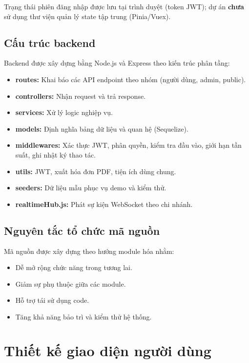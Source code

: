 \documentclass[../DoAn.tex]{subfiles}
\begin{document}
Trạng thái phiên đăng nhập được lưu tại trình duyệt (token JWT); dự án \textbf{chưa} sử dụng thư viện quản lý state tập trung (Pinia/Vuex).

\subsection{Cấu trúc backend}

Backend được xây dựng bằng Node.js và Express theo kiến trúc phân tầng:

\begin{itemize}
    \item \textbf{routes:} Khai báo các API endpoint theo nhóm (người dùng, admin, public).
    \item \textbf{controllers:} Nhận request và trả response.
    \item \textbf{services:} Xử lý logic nghiệp vụ.
    \item \textbf{models:} Định nghĩa bảng dữ liệu và quan hệ (Sequelize).
    \item \textbf{middlewares:} Xác thực JWT, phân quyền, kiểm tra đầu vào, giới hạn tần suất, ghi nhật ký thao tác.
    \item \textbf{utils:} JWT, xuất hóa đơn PDF, tiện ích dùng chung.
    \item \textbf{seeders:} Dữ liệu mẫu phục vụ demo và kiểm thử.
    \item \textbf{realtimeHub.js:} Phát sự kiện WebSocket theo chi nhánh.
\end{itemize}

\subsection{Nguyên tắc tổ chức mã nguồn}

Mã nguồn được xây dựng theo hướng module hóa nhằm:
\begin{itemize}
    \item Dễ mở rộng chức năng trong tương lai.
    \item Giảm sự phụ thuộc giữa các module.
    \item Hỗ trợ tái sử dụng code.
    \item Tăng khả năng bảo trì và kiểm thử hệ thống.
\end{itemize}

\section{Thiết kế giao diện người dùng}
\label{section:4.3}
\end{document}

